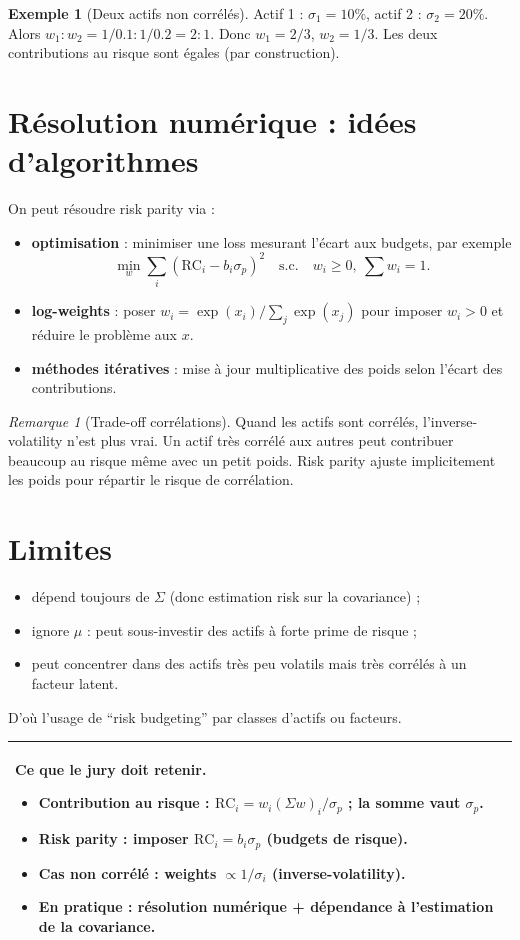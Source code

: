 \documentclass[11pt,a4paper]{report}
\newcommand{\1}{\mathbbm{1}}
\theoremstyle{definition}
\newtheorem{example}{Exemple}[chapter]
\theoremstyle{plain}
\theoremstyle{remark}
\newtheorem{remark}{Remarque}[chapter]
\newenvironment{jurybox}{%
  \begin{center}
  \setlength{\tabcolsep}{6pt}%
  \renewcommand{\arraystretch}{1.1}%
  \begin{tabular}{|p{0.94\textwidth}|}
  \hline
  \small\textbf{Ce que le jury doit retenir.}\par\medskip
}{%
  \\ \hline
  \end{tabular}
  \end{center}
}
\begin{document}
\begin{example}[Deux actifs non corrélés]
Actif 1 : $\sigma_1=10\%$, actif 2 : $\sigma_2=20\%$.
Alors $w_1:w_2 = 1/0.1 : 1/0.2 = 2:1$.
Donc $w_1=2/3$, $w_2=1/3$.
Les deux contributions au risque sont égales (par construction).
\end{example}

\section{Résolution numérique : idées d'algorithmes}
\label{sec:rp_algo}

On peut résoudre risk parity via :
\begin{itemize}
  \item \textbf{optimisation} : minimiser une loss mesurant l'écart aux budgets, par exemple
  \[
  \min_w \sum_i \left(\mathrm{RC}_i - b_i\sigma_p\right)^2
  \quad \text{s.c.}\quad w_i\ge 0,\ \sum w_i=1.
  \]
  \item \textbf{log-weights} : poser $w_i=\exp(x_i)/\sum_j \exp(x_j)$ pour imposer $w_i>0$ et réduire le problème aux $x$.
  \item \textbf{méthodes itératives} : mise à jour multiplicative des poids selon l'écart des contributions.
\end{itemize}

\begin{remark}[Trade-off corrélations]
Quand les actifs sont corrélés, l'inverse-volatility n'est plus vrai.
Un actif très corrélé aux autres peut contribuer beaucoup au risque même avec un petit poids.
Risk parity ajuste implicitement les poids pour répartir le risque de corrélation.
\end{remark}

\section{Limites}
\begin{itemize}
  \item dépend toujours de $\Sigma$ (donc estimation risk sur la covariance) ;
  \item ignore $\mu$ : peut sous-investir des actifs à forte prime de risque ;
  \item peut concentrer dans des actifs très peu volatils mais très corrélés à un facteur latent.
\end{itemize}
D'où l'usage de ``risk budgeting'' par classes d'actifs ou facteurs.

\begin{jurybox}
\begin{itemize}
\item Contribution au risque : $\mathrm{RC}_i = w_i(\Sigma w)_i/\sigma_p$ ; la somme vaut $\sigma_p$.
\item Risk parity : imposer $\mathrm{RC}_i=b_i\sigma_p$ (budgets de risque).
\item Cas non corrélé : weights $\propto 1/\sigma_i$ (inverse-volatility).
\item En pratique : résolution numérique + dépendance à l'estimation de la covariance.
\end{itemize}
\end{jurybox}
\end{document}
